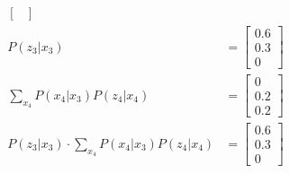 \documentclass[answers]{exam}
\begin{document}
\begin{questions}
\begin{parts}
\begin{solution}
\begin{align*}
\begin{bmatrix}
                                                                                                                    \end{bmatrix}                                                                                                                                                                                                          \\
                P(z_3 | x_3)                                                                                    & = \begin{bmatrix}
                                                                                                                        0.6 \\
                                                                                                                        0.3 \\
                                                                                                                        0
                                                                                                                    \end{bmatrix}                                                                                                                                                                                                          \\
                \sum_{x_4} P(x_4 | x_3) P(z_4 | x_4)                                                            & = \begin{bmatrix} 0 \\ 0.2 \\ 0.2 \end{bmatrix}                                                                                                                                                                           \\
                P(z_3 | x_3) \cdot \sum_{x_4} P(x_4 | x_3) P(z_4 | x_4)                                         & = \begin{bmatrix}
                                                                                                                        0.6 \\
                                                                                                                        0.3 \\
                                                                                                                        0

\end{bmatrix}
\end{align*}
\end{solution}
\end{parts}
\end{questions}
\end{document}
